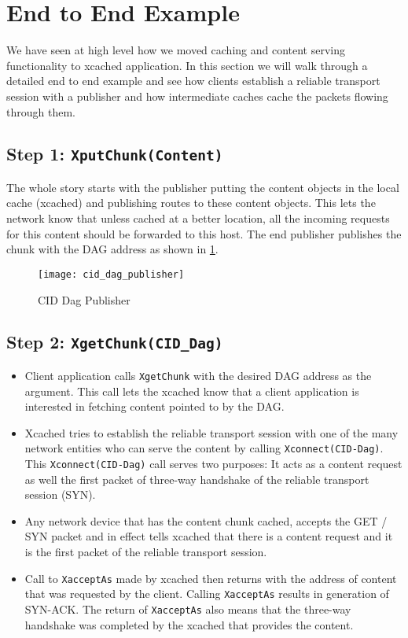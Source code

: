 \section{End to End Example}

We have seen at high level how we moved caching and content serving
functionality to xcached application. In this section we will walk
through a detailed end to end example and see how clients establish
a reliable transport session with a publisher and how intermediate
caches cache the packets flowing through them.

\subsection{Step 1: \texttt{XputChunk(Content)}}
The whole story starts with the publisher putting the content objects
in the local cache (xcached) and publishing routes to these content
objects. This lets the network know that unless cached at a better
location, all the incoming requests for this content should be
forwarded to this host. The end publisher publishes the chunk with the
DAG address as shown in \ref{fig:cid_dag_publisher}.

\begin{figure}
  \begin{center}
    \texttt{[image: cid\_dag\_publisher]}
    \caption{CID Dag Publisher}
    \label{fig:cid_dag_publisher}
  \end{center}
\end{figure}
\subsection{Step 2: \texttt{XgetChunk(CID\_Dag)}}
\begin{itemize}
\item{Client application calls \texttt{XgetChunk} with the desired DAG
  address as the argument. This call lets the xcached know that a client
  application is interested in fetching content pointed to by the
  DAG.}
\item{Xcached tries to establish the reliable transport session with
  one of the many network entities who can serve the content by calling
  \texttt{Xconnect(CID-Dag)}. This \texttt{Xconnect(CID-Dag)} call
  serves two purposes: It acts as a content request as well the first
  packet of three-way handshake of the reliable transport session
  (SYN).}
\item{Any network device that has the content chunk cached, accepts
  the GET / SYN packet and in effect tells xcached that there is a
  content request and it is the first packet of the reliable transport
  session.}
\item{Call to \texttt{XacceptAs} made by xcached then returns with the
  address of content that was requested by the client. Calling
  \texttt{XacceptAs} results in generation of SYN-ACK. The return of
  \texttt{XacceptAs} also means that the three-way handshake was
  completed by the xcached that provides the content.}
\end{itemize}
